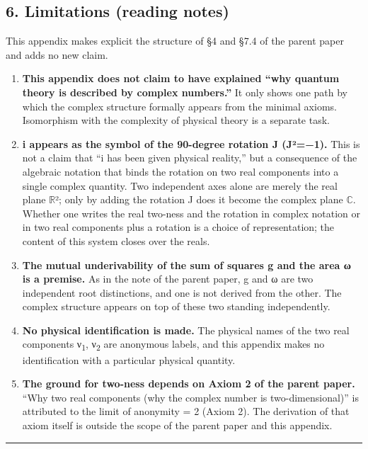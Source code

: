 \documentclass[11pt]{ltjsarticle}
\begin{document}
\subsection{6. Limitations (reading
notes)}\label{limitations-reading-notes}

This appendix makes explicit the structure of §4 and §7.4 of the parent
paper and adds no new claim.

\begin{enumerate}
\def\labelenumi{\arabic{enumi}.}
\item
  \textbf{This appendix does not claim to have explained ``why quantum
  theory is described by complex numbers.''} It only shows one path by
  which the complex structure formally appears from the minimal axioms.
  Isomorphism with the complexity of physical theory is a separate task.
\item
  \textbf{i appears as the symbol of the 90-degree rotation J (J²=−1).}
  This is not a claim that ``i has been given physical reality,'' but a
  consequence of the algebraic notation that binds the rotation on two
  real components into a single complex quantity. Two independent axes
  alone are merely the real plane $\mathbb{R}$²; only by adding the rotation J does
  it become the complex plane $\mathbb{C}$. Whether one writes the real two-ness
  and the rotation in complex notation or in two real components plus a
  rotation is a choice of representation; the content of this system
  closes over the reals.
\item
  \textbf{The mutual underivability of the sum of squares g and the area
  ω is a premise.} As in the note of the parent paper, g and ω are two
  independent root distinctions, and one is not derived from the other.
  The complex structure appears on top of these two standing
  independently.
\item
  \textbf{No physical identification is made.} The physical names of the
  two real components ν\textsubscript{1}, ν\textsubscript{2} are anonymous labels, and this appendix
  makes no identification with a particular physical quantity.
\item
  \textbf{The ground for two-ness depends on Axiom 2 of the parent
  paper.} ``Why two real components (why the complex number is
  two-dimensional)'' is attributed to the limit of anonymity = 2 (Axiom
  2). The derivation of that axiom itself is outside the scope of the
  parent paper and this appendix.
\end{enumerate}

\begin{center}\rule{0.5\linewidth}{0.5pt}\end{center}
\end{document}
